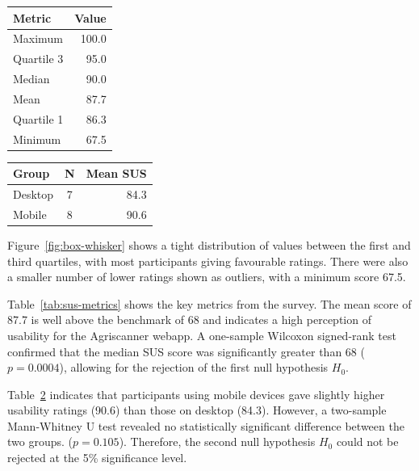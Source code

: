 \begin{table}[H]
  \centering
  \small
  \begin{minipage}[t]{0.48\textwidth}
    \centering
    \begin{tabular}{l r}
      \hline
      Metric & Value \\
      \hline
      Maximum     & 100.0 \\
      Quartile 3  & 95.0 \\
      Median      & 90.0 \\
      Mean        & 87.7 \\
      Quartile 1  & 86.3 \\
      Minimum     & 67.5 \\
      \hline
    \end{tabular}
    \label{tab:sus-metrics}
  \end{minipage}\hfill
  \begin{minipage}[t]{0.48\textwidth}
    \centering
    \begin{tabular}{l c r}
      \hline
      Group & N & Mean SUS \\
      \hline
      Desktop & 7 & 84.3 \\
      Mobile  & 8 & 90.6 \\
      \hline
    \end{tabular}
    \label{tab:sus-by-device}
  \end{minipage}
\end{table} 

Figure~\ref{fig:box-whisker} shows a tight distribution of values between the
first and third quartiles, with most participants giving favourable ratings.
There were also a smaller number of lower ratings shown as outliers, with a
minimum score 67.5.

Table~\ref{tab:sus-metrics} shows the key metrics from the survey. The mean
score of 87.7 is well above the benchmark of 68 and indicates a high perception
of usability for the Agriscanner webapp. A one-sample Wilcoxon signed-rank test
confirmed that the median SUS score was significantly greater than 68
(\(p=0.0004\)), allowing for the rejection of the first null hypothesis \(H_0\).

Table~\ref{tab:sus-by-device} indicates that participants using mobile devices
gave slightly higher usability ratings (90.6) than those on desktop (84.3).
However, a two-sample Mann-Whitney U test revealed no statistically significant
difference between the two groups. (\(p=0.105\)). Therefore, the second null
hypothesis \(H_0\) could not be rejected at the 5\% significance level.



